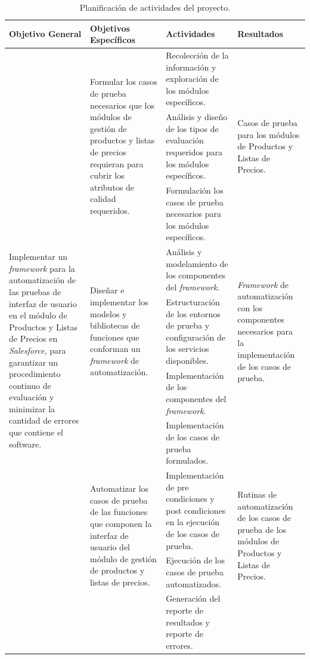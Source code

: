\begin{table}
\centering
\small
{\def\arraystretch{1.75}
\begin{tabular}{|l|l|p{6.5cm}|l|}
\hline
Objetivo General & Objetivos Específicos & Actividades & Resultados \\
\hline
\multirow{10}{4.0cm}{Implementar un \emph{framework} para la automatización de
las pruebas de interfaz de usuario en el módulo de Productos y Listas de Precios
en \emph{Salesforce}, para garantizar un procedimiento continuo de evaluación y
minimizar la cantidad de errores que contiene el software.} &
\multirow{3}{4.0cm}{Formular los casos de prueba necesarios que los módulos de
gestión de productos y listas de precios requieran para cubrir los atributos de
calidad requeridos.} &
Recolección de la información y exploración de los módulos específicos. &
\multirow{3}{4.0cm}{Casos de prueba para los módulos de Productos y Listas de
Precios.} \\
\cline{3-3}
& & Análisis y diseño de los tipos de evaluación requeridos para los módulos
específicos. & \\
\cline{3-3}
& & Formulación los casos de prueba necesarios para los módulos
específicos. & \\
\cline{2-4}

& \multirow{3}{4.0cm}{Diseñar e implementar los modelos y bibliotecas de
funciones que conforman un \emph{framework} de automatización.} &
Análisis y modelamiento de los componentes del \emph{framework}. &
\multirow{3}{4.0cm}{\emph{Framework} de automatización con los componentes
necesarios para la implementación de los casos de prueba.} \\
\cline{3-3}
& & Estructuración de los entornos de prueba y configuración de los servicios
disponibles. & \\
\cline{3-3}
& & Implementación de los componentes del \emph{framework}. & \\
\cline{2-4}

& \multirow{4}{4.0cm}{Automatizar los casos de prueba de las funciones que
componen la interfaz de usuario del módulo de gestión de productos y listas de
precios.} &
Implementación de los casos de prueba formulados. &
\multirow{4}{4.0cm}{Rutinas de automatización de los casos de prueba de los
módulos de Productos y Listas de Precios.} \\
\cline{3-3}
& & Implementación de pre condiciones y post condiciones en la ejecución de los
casos de prueba. & \\
\cline{3-3}
& & Ejecución de los casos de prueba automatizados. & \\
\cline{3-3}
& & Generación del reporte de resultados y reporte de errores. & \\
\hline
\end{tabular}}
\caption{Planificación de actividades del proyecto.}
\label{planificacion}
\end{table}

